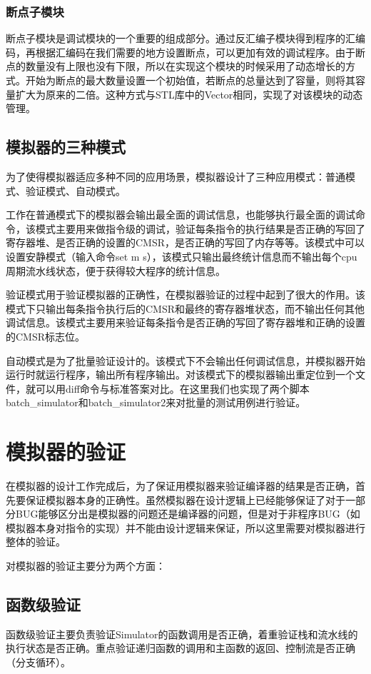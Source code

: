 \documentclass[12pt,a4paper]{article}
\begin{document}
\subsubsection{断点子模块}
断点子模块是调试模块的一个重要的组成部分。通过反汇编子模块得到程序的汇编码，再根据汇编码在我们需要的地方设置断点，可以更加有效的调试程序。由于断点的数量没有上限也没有下限，所以在实现这个模块的时候采用了动态增长的方式。开始为断点的最大数量设置一个初始值，若断点的总量达到了容量，则将其容量扩大为原来的二倍。这种方式与STL库中的Vector相同，实现了对该模块的动态管理。

\subsection{模拟器的三种模式}
为了使得模拟器适应多种不同的应用场景，模拟器设计了三种应用模式：普通模式、验证模式、自动模式。

工作在普通模式下的模拟器会输出最全面的调试信息，也能够执行最全面的调试命令，该模式主要用来做指令级的调试，验证每条指令的执行结果是否正确的写回了寄存器堆、是否正确的设置的CMSR，是否正确的写回了内存等等。该模式中可以设置安静模式（输入命令set m s），该模式只输出最终统计信息而不输出每个cpu周期流水线状态，便于获得较大程序的统计信息。

验证模式用于验证模拟器的正确性，在模拟器验证的过程中起到了很大的作用。该模式下只输出每条指令执行后的CMSR和最终的寄存器堆状态，而不输出任何其他调试信息。该模式主要用来验证每条指令是否正确的写回了寄存器堆和正确的设置的CMSR标志位。

自动模式是为了批量验证设计的。该模式下不会输出任何调试信息，并模拟器开始运行时就运行程序，输出所有程序输出。对该模式下的模拟器输出重定位到一个文件，就可以用diff命令与标准答案对比。在这里我们也实现了两个脚本batch\_simulator和batch\_simulator2来对批量的测试用例进行验证。


\section{模拟器的验证}

在模拟器的设计工作完成后，为了保证用模拟器来验证编译器的结果是否正确，首先要保证模拟器本身的正确性。虽然模拟器在设计逻辑上已经能够保证了对于一部分BUG能够区分出是模拟器的问题还是编译器的问题，但是对于非程序BUG（如模拟器本身对指令的实现）并不能由设计逻辑来保证，所以这里需要对模拟器进行整体的验证。

对模拟器的验证主要分为两个方面：

\subsection{函数级验证}
函数级验证主要负责验证Simulator的函数调用是否正确，着重验证栈和流水线的执行状态是否正确。重点验证递归函数的调用和主函数的返回、控制流是否正确（分支循环）。
\end{document}
